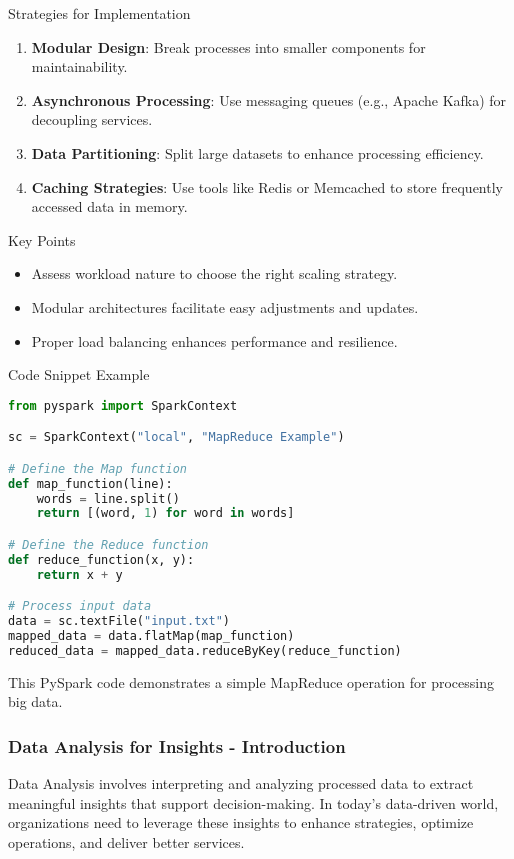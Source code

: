 \documentclass[aspectratio=169]{beamer}
\begin{document}
\begin{frame}{Strategies for Implementation}
    \begin{enumerate}
        \item \textbf{Modular Design}: Break processes into smaller components for maintainability.
        \item \textbf{Asynchronous Processing}: Use messaging queues (e.g., Apache Kafka) for decoupling services.
        \item \textbf{Data Partitioning}: Split large datasets to enhance processing efficiency.
        \item \textbf{Caching Strategies}: Use tools like Redis or Memcached to store frequently accessed data in memory.
    \end{enumerate}

    \begin{block}{Key Points}
        \begin{itemize}
            \item Assess workload nature to choose the right scaling strategy.
            \item Modular architectures facilitate easy adjustments and updates.
            \item Proper load balancing enhances performance and resilience.
        \end{itemize}
    \end{block}
\end{frame}

\begin{frame}[fragile]{Code Snippet Example}
    \begin{lstlisting}[language=Python]
from pyspark import SparkContext

sc = SparkContext("local", "MapReduce Example")

# Define the Map function
def map_function(line):
    words = line.split()
    return [(word, 1) for word in words]

# Define the Reduce function
def reduce_function(x, y):
    return x + y

# Process input data
data = sc.textFile("input.txt")
mapped_data = data.flatMap(map_function)
reduced_data = mapped_data.reduceByKey(reduce_function)
    \end{lstlisting}
    This PySpark code demonstrates a simple MapReduce operation for processing big data.
\end{frame}

\begin{frame}
    \frametitle{Data Analysis for Insights - Introduction}
    Data Analysis involves interpreting and analyzing processed data to extract meaningful insights that support decision-making. In today's data-driven world, organizations need to leverage these insights to enhance strategies, optimize operations, and deliver better services.
\end{frame}
\end{document}
